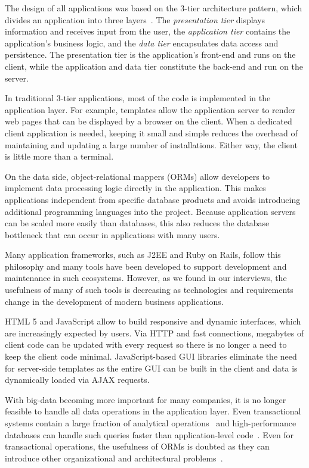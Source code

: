 The design of all applications was based on the 3-tier architecture pattern, which divides an application into three layers~\cite{eckerson95:three_tier_clientserver_architecture}.
The \emph{presentation tier} displays information and receives input from the user,
the \emph{application tier} contains the application's business logic, and
the \emph{data tier} encapsulates data access and persistence.
The presentation tier is the application's front-end and runs on the client, while the application and data tier constitute the back-end and run on the server.

In traditional 3-tier applications, most of the code is implemented in the application layer.
For example, templates allow the application server to render web pages that can be displayed by a browser on the client.
When a dedicated client application is needed, keeping it small and simple reduces the overhead of maintaining and updating a large number of installations.
Either way, the client is little more than a terminal.

On the data side, object-relational mappers (ORMs) allow developers to implement data processing logic directly in the application.
This makes applications independent from specific database products and avoids introducing additional programming languages into the project.
Because application servers can be scaled more easily than databases, this also reduces the database bottleneck that can occur in applications with many users.

Many application frameworks, such as J2EE and Ruby on Rails, follow this philosophy and many tools have been developed to support development and maintenance in such ecosystems.
However, as we found in our interviews, the usefulness of many of such tools is decreasing as technologies and requirements change in the development of modern business applications.

HTML 5 and JavaScript allow to build responsive and dynamic interfaces, which are increasingly expected by users.
Via HTTP and fast connections, megabytes of client code can be updated with every request so there is no longer a need to keep the client code minimal.
JavaScript-based GUI libraries eliminate the need for server-side templates as the entire GUI can be built in the client and data is dynamically loaded via AJAX requests.

With big-data becoming more important for many companies, it is no longer feasible to handle all data operations in the application layer.
Even transactional systems contain a large fraction of analytical operations~\cite{krueger10:a_case_for_online} and high-performance databases can handle such queries faster than application-level code~\cite{plattner09:a_common_database_approach}.
Even for transactional operations, the usefulness of ORMs is doubted as they can introduce other organizational and architectural problems~\cite{neward06:the_vietnam_of_computer}.

